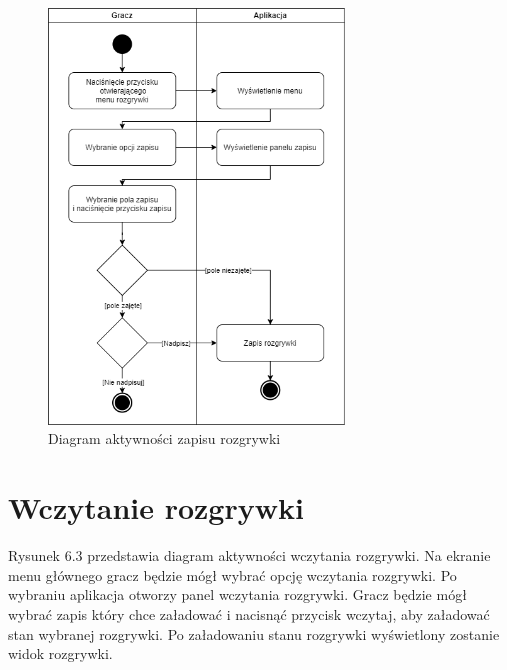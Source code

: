 \begin{figure}[H]
    \centering
        \includegraphics[width=0.7\textwidth]{Graphics/activities/save_game (1).png}
         \caption{Diagram aktywności zapisu rozgrywki}
\end{figure}

\clearpage

\section{Wczytanie rozgrywki}

Rysunek 6.3 przedstawia diagram aktywności wczytania rozgrywki.
Na ekranie menu głównego gracz będzie mógł wybrać opcję wczytania rozgrywki. Po wybraniu aplikacja otworzy panel wczytania rozgrywki. Gracz będzie mógł wybrać zapis który chce załadować i nacisnąć przycisk wczytaj, aby załadować stan wybranej rozgrywki. Po załadowaniu stanu rozgrywki wyświetlony zostanie widok rozgrywki.

